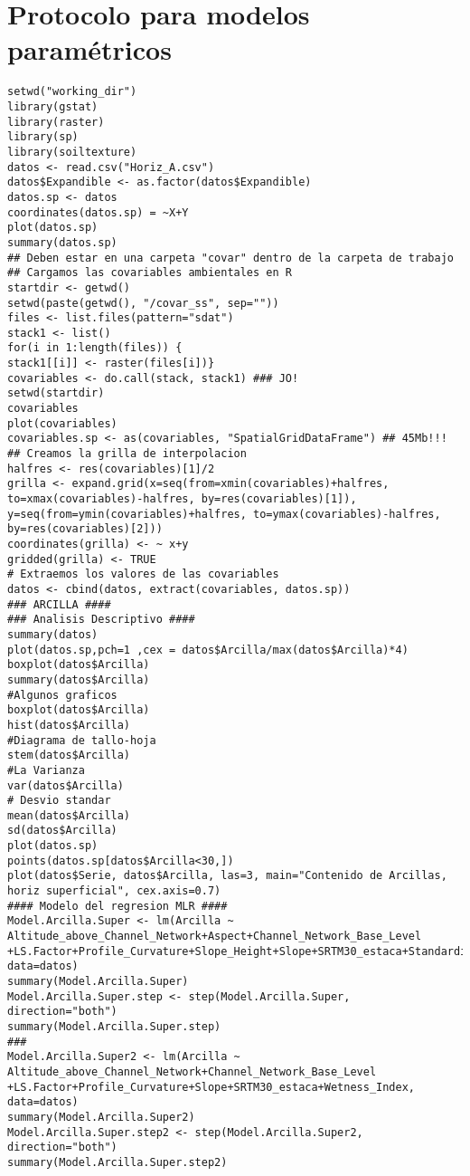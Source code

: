 \documentclass[10pt,a4paper]{article}
\begin{document}
\section{Protocolo para modelos paramétricos}
\begin{lstlisting}
setwd("working_dir")
library(gstat)
library(raster)
library(sp)
library(soiltexture)
datos <- read.csv("Horiz_A.csv")
datos$Expandible <- as.factor(datos$Expandible)
datos.sp <- datos
coordinates(datos.sp) = ~X+Y
plot(datos.sp)
summary(datos.sp)
## Deben estar en una carpeta "covar" dentro de la carpeta de trabajo
## Cargamos las covariables ambientales en R
startdir <- getwd()
setwd(paste(getwd(), "/covar_ss", sep=""))
files <- list.files(pattern="sdat")
stack1 <- list()
for(i in 1:length(files)) {
stack1[[i]] <- raster(files[i])}
covariables <- do.call(stack, stack1) ### JO!
setwd(startdir)
covariables
plot(covariables)
covariables.sp <- as(covariables, "SpatialGridDataFrame") ## 45Mb!!!
## Creamos la grilla de interpolacion
halfres <- res(covariables)[1]/2
grilla <- expand.grid(x=seq(from=xmin(covariables)+halfres, to=xmax(covariables)-halfres, by=res(covariables)[1]), y=seq(from=ymin(covariables)+halfres, to=ymax(covariables)-halfres, by=res(covariables)[2]))
coordinates(grilla) <- ~ x+y
gridded(grilla) <- TRUE
# Extraemos los valores de las covariables
datos <- cbind(datos, extract(covariables, datos.sp))
### ARCILLA ####
### Analisis Descriptivo ####
summary(datos)
plot(datos.sp,pch=1 ,cex = datos$Arcilla/max(datos$Arcilla)*4)
boxplot(datos$Arcilla)
summary(datos$Arcilla)
#Algunos graficos
boxplot(datos$Arcilla)
hist(datos$Arcilla)
#Diagrama de tallo-hoja
stem(datos$Arcilla)
#La Varianza
var(datos$Arcilla)
# Desvio standar
mean(datos$Arcilla)
sd(datos$Arcilla)
plot(datos.sp)
points(datos.sp[datos$Arcilla<30,])
plot(datos$Serie, datos$Arcilla, las=3, main="Contenido de Arcillas, horiz superficial", cex.axis=0.7)
#### Modelo del regresion MLR ####
Model.Arcilla.Super <- lm(Arcilla ~ Altitude_above_Channel_Network+Aspect+Channel_Network_Base_Level
+LS.Factor+Profile_Curvature+Slope_Height+Slope+SRTM30_estaca+Standardized_Height+Valley_Depth+Wetness_Index, data=datos)
summary(Model.Arcilla.Super)
Model.Arcilla.Super.step <- step(Model.Arcilla.Super, direction="both")
summary(Model.Arcilla.Super.step)
###
Model.Arcilla.Super2 <- lm(Arcilla ~ Altitude_above_Channel_Network+Channel_Network_Base_Level
+LS.Factor+Profile_Curvature+Slope+SRTM30_estaca+Wetness_Index, data=datos)
summary(Model.Arcilla.Super2)
Model.Arcilla.Super.step2 <- step(Model.Arcilla.Super2, direction="both")
summary(Model.Arcilla.Super.step2)

\end{lstlisting}
\end{document}
